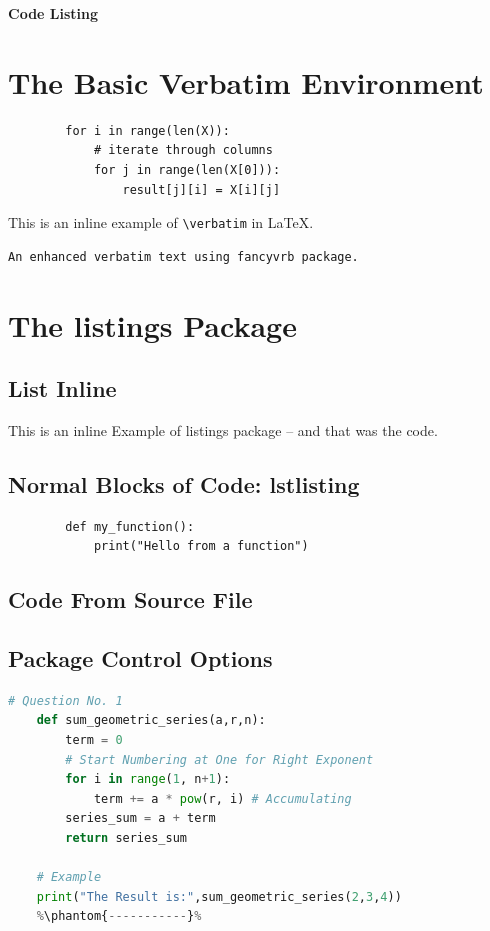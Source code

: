 \documentclass{article}
\begin{document}
	{\noindent \Huge \textbf{Code Listing}}
	
	\vspace{2cm}
	
	\section{The Basic Verbatim Environment}
	\begin{verbatim}
		for i in range(len(X)):
   			# iterate through columns
   			for j in range(len(X[0])):
       			result[j][i] = X[i][j]
	\end{verbatim}
	
	This is an inline example of \verb|\verbatim| in \LaTeX.
	
	\begin{Verbatim}[frame=single,framerule=1mm,
					 framesep=5mm,
					 fillcolor=\color{gray!50}]
	An enhanced verbatim text using fancyvrb package.
	\end{Verbatim}
	
	\vspace{1cm}
	
	\section{The listings Package}
	\subsection{List Inline}
	This is an inline Example of listings 						package  -- and that was the code.
	
	\subsection{Normal Blocks of Code: lstlisting}
	\begin{lstlisting}
		def my_function():
  			print("Hello from a function")
	\end{lstlisting}
	
	\subsection{Code From Source File}
	
	
	\subsection{Package Control Options}
	\begin{lstlisting}[style=PythonCode,
					   name=PyBlock,
					   language=Python,
					   frame = ltr,
					   caption=Geometric Series Sum.]
	# Question No. 1
	def sum_geometric_series(a,r,n):
    	term = 0
    	# Start Numbering at One for Right Exponent
    	for i in range(1, n+1): 
        	term += a * pow(r, i) # Accumulating
    	series_sum = a + term
    	return series_sum
	
	# Example
	print("The Result is:",sum_geometric_series(2,3,4))
	%\phantom{-----------}%
	\end{lstlisting}
	
\end{document}
